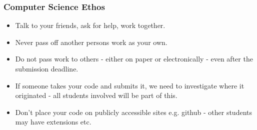\begin{frame}%
\frametitle{Computer Science Ethos}
\begin{itemize}[<+->]
\item Talk to your friends, ask for help, work together.
\item Never pass off another persons work as your own.
\item Do not pass work to others - either on paper or
electronically - even after the submission deadline.
\item If someone takes your code and submits it, we need to investigate where it originated - all students involved
will be part of this.
\item Don't place your code on publicly accessible sites e.g. github - other students may have extensions etc.
\end{itemize}
\end{frame}

